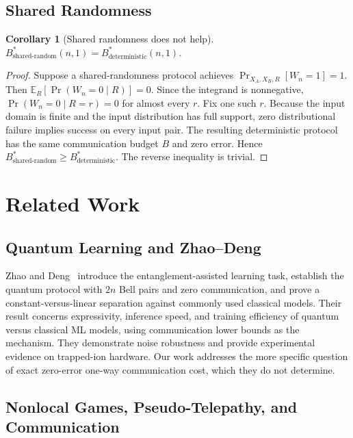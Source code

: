 \documentclass[11pt,letterpaper]{article}
\newtheorem{corollary}[theorem]{Corollary}
\newcommand{\Bstar}{B^{\!*}}
\begin{document}
\subsection{Shared Randomness}

\begin{corollary}[Shared randomness does not help]
\label{cor:shared}
$\Bstar_{\text{shared-random}}(n,1) = \Bstar_{\text{deterministic}}(n,1)$.
\end{corollary}

\begin{proof}
Suppose a shared-randomness protocol achieves $\Pr_{X_A, X_B, R}[W_n = 1] = 1$. Then $\mathbb{E}_R[\Pr(W_n = 0 \mid R)] = 0$. Since the integrand is nonnegative, $\Pr(W_n = 0 \mid R = r) = 0$ for almost every $r$. Fix one such $r$. Because the input domain is finite and the input distribution has full support, zero distributional failure implies success on every input pair. The resulting deterministic protocol has the same communication budget $B$ and zero error. Hence $\Bstar_{\text{shared-random}} \geq \Bstar_{\text{deterministic}}$. The reverse inequality is trivial.
\end{proof}

\section{Related Work}
\label{sec:related}

\subsection{Quantum Learning and Zhao--Deng}

Zhao and Deng~\cite{zhaodeng2025} introduce the entanglement-assisted learning task, establish the quantum protocol with $2n$ Bell pairs and zero communication, and prove a constant-versus-linear separation against commonly used classical models. Their result concerns expressivity, inference speed, and training efficiency of quantum versus classical ML models, using communication lower bounds as the mechanism. They demonstrate noise robustness and provide experimental evidence on trapped-ion hardware. Our work addresses the more specific question of exact zero-error one-way communication cost, which they do not determine.

\subsection{Nonlocal Games, Pseudo-Telepathy, and Communication}
\end{document}
